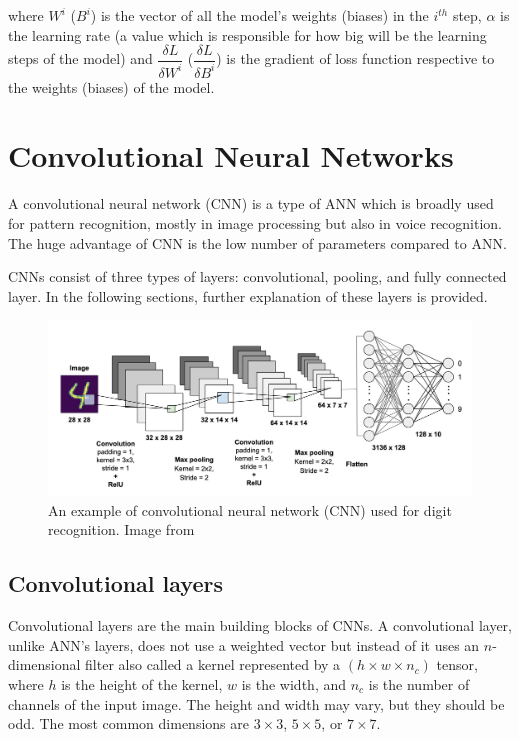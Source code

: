 \documentclass[thesis=B,english]{FITthesis}[2019/12/23]
\begin{document}
where $W^{i}$ ($B^{i}$) is the vector of all the model's weights (biases) in the $i^{th}$ step, $\alpha$ is the learning rate (a value which is responsible for how big will be the learning steps of the model) and $\dfrac{\delta L}{\delta W^{i}} $ ($\dfrac{\delta L}{\delta B^{i}}$) is the gradient of loss function respective to the weights (biases) of the model.

\section{Convolutional Neural Networks}
A convolutional neural network (CNN) is a type of ANN which is broadly used for pattern recognition, mostly in image processing but also in voice recognition. The huge advantage of CNN is the low number of parameters compared to ANN.

CNNs consist of three types of layers: convolutional, pooling, and fully connected layer. In the following sections, further explanation of these layers is provided. 

\begin{figure}[ht]
		\includegraphics[scale=0.19]{images/CNN.png}
		\centering
		\caption{An example of convolutional neural network (CNN) used for digit recognition. Image from \cite{cnn_image}}
\end{figure}

\subsection{Convolutional layers}

Convolutional layers are the main building blocks of CNNs. A convolutional layer, unlike ANN's layers, does not use a weighted vector but instead of it uses an $n$-dimensional filter also called a kernel represented by a $(h\times w\times n_c)$ tensor, where $h$ is the height of the kernel, $w$ is the width, and  $n_c$ is the number of channels of the input image. The height and width may vary, but they should be odd. The most common dimensions are $3\times3$, $5\times5$, or $7\times7$. 
\end{document}
